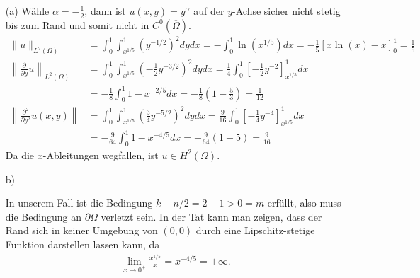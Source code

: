 \begin{solution}
\phantom{}
\begin{itemize}
    \item[(a)] Wähle $\alpha = -\frac{1}{2}$, dann ist $u(x,y) = y^{\alpha}$ auf der $y$-Achse
    sicher nicht stetig bis zum Rand und somit nicht in $C^0(\overline{\Omega})$.
    \begin{align*}
      \|u\|_{L^2(\Omega)} &= \int_0^1\int_{x^{1/5}}^1 (y^{-1/2})^2 dy dx
      = -\int_0^1 \ln(x^{1/5}) dx = -\frac{1}{5}[x\ln(x) - x]_0^1 = \frac{1}{5} \\
      \left\|\frac{\partial}{\partial y}u\right\|_{L^2(\Omega)} &=
      \int_0^1\int_{x^{1/5}}^1 \left(-\frac{1}{2}y^{-3/2}\right)^2 dy dx
      = \frac{1}{4}\int_0^1\left[-\frac{1}{2}y^{-2}\right]_{x^{1/5}}^1 dx \\
      &= -\frac{1}{8}\int_0^1 1 - x^{-2/5} dx = -\frac{1}{8}\left(1 - \frac{5}{3}\right) = \frac{1}{12} \\
      \left\|\frac{\partial^2}{\partial y^2}u(x,y)\right\| &=
      \int_0^1\int_{x^{1/5}}^1 \left(\frac{3}{4}y^{-5/2}\right)^2 dy dx
      = \frac{9}{16}\int_0^1 \left[-\frac{1}{4}y^{-4}\right]_{x^{1/5}}^1 dx \\
      &= -\frac{9}{64}\int_0^1 1 - x^{-4/5} dx = -\frac{9}{64}(1 - 5) = \frac{9}{16}
    \end{align*}
    Da die $x$-Ableitungen wegfallen, ist $u \in H^2(\Omega)$.
    \item[b)]

    \begin{figure}[h!]
      \centering
      \caption{\cite{PDEs}}
      \label{fig:Satz 5.9}
    \end{figure}

    In unserem Fall ist die Bedingung $k - n/2 = 2 - 1 > 0 = m$ erfüllt, also
    muss die Bedingung an $\partial \Omega$ verletzt sein.
    In der Tat kann man zeigen, dass der Rand sich in keiner Umgebung von $(0,0)$
    durch eine Lipschitz-stetige Funktion darstellen lassen kann, da
    \begin{align*}
      \lim_{x \to 0^+}\frac{x^{1/5}}{x} = x^{-4/5} = +\infty.
    \end{align*}
\end{itemize}


\end{solution}

